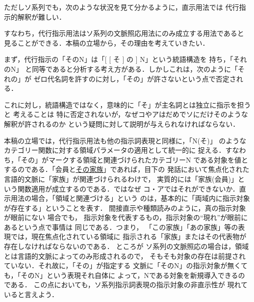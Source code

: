 
ただしソ系列でも，次のような状況を見て分かるように，直示用法では
代行指示的解釈が難しい．


すなわち，代行指示用法はソ系列の文脈照応用法にのみ成立する用法であると
見ることができる．本稿の立場から，その理由を考えていきたい．

まず，代行指示の「そのN」は「[ [ そ ] の ] N」という統語構造を
持ち，「それのN」
と同等であると分析する考え方がある．しかしこれは，次のように「それの」が
ゼロ代名詞を許すのに対し，「その」が許さないという点で否定される．


これに対し，統語構造ではなく，意味的に「そ」が主名詞とは独立に指示を担うと
考えることは
特に否定されないが，なぜコやアはだめでソにだけそのような解釈が許されるのか
という疑問に対して説明が与えられなければならない．

本稿の立場では，代行指示用法も他の指示詞表現と同様に，「N(そ)」
のようなカテゴリー関数に対する領域パラメータの適用として統一的に
捉える．すなわち，「その」がマークする領域と関連づけられたカテゴリーN
である対象を値とするのである．「会員と\ul{その家族}」であれば，目下の
発話において焦点化された言語的文脈に「家族」が関連づけられるわけで，
実質的には「家族(会員)」という関数適用が成立するのである．ではなぜ
コ・アではそれができないか．直示用法の場合，「領域と関連づける」という
のは，基本的に「両域内に指示対象が存在する」ということを表す．
間接直示や種類読みのように，真の指示対象が眼前にない
場合でも，
指示対象を代表するもの，指示対象の``現れ''が眼前にあるという点で事情は
同じである．つまり，
「この家族」「あの家族」等の表現では，現在焦点化されている領域に
指示される「家族」またはその代表物が存在しなければならないのである．
ところが
ソ系列の文脈照応の場合は，領域とは言語的文脈によってのみ形成されるので，
そもそも対象の存在は前提されていない．それ故に，「その」が指定する
文脈に「そのN」の指示対象が無くても，「そのN」という表現それ自体に
よって，Nである対象を新規導入できるのである．
この点においても，ソ系列指示詞表現の指示対象の非直示性が
現れていると言えよう．

